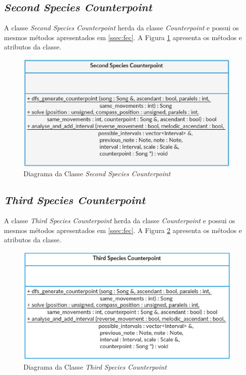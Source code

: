     \subsection[\textit{Second Species Counterpoint}]{\textit{Second Species Counterpoint}}

      A classe \textit{Second Species Counterpoint} herda da classe \textit{Counterpoint} e possui os mesmos métodos apresentados em \ref{ssec:fec}. A Figura \ref{secondspeciescounterpointclass} apresenta os métodos e atributos da classe.

      \begin{figure}[htb]
        \centering
        \includegraphics[scale=0.7]{figuras/secondspeciescounterpointclass.eps}
        \caption{Diagrama da Classe \textit{Second Species Counterpoint}}
        \label{secondspeciescounterpointclass}
      \end{figure}


    \subsection[\textit{Third Species Counterpoint}]{\textit{Third Species Counterpoint}}

    A classe \textit{Third Species Counterpoint} herda da classe \textit{Counterpoint} e possui os mesmos métodos apresentados em \ref{ssec:fec}. A Figura \ref{thirdspeciescounterpointclass} apresenta os métodos e atributos da classe.

    \begin{figure}[htb]
      \centering
      \includegraphics[scale=0.7]{figuras/thirdspeciescounterpointclass.eps}
      \caption{Diagrama da Classe \textit{Third Species Counterpoint}}
      \label{thirdspeciescounterpointclass}
    \end{figure}

